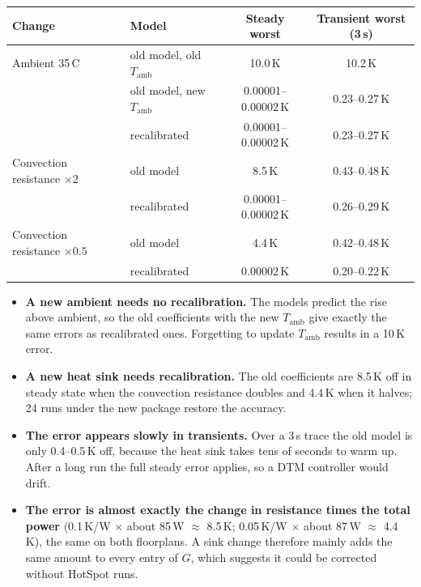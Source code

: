 \documentclass[11pt,a4paper]{article}
\newcommand{\degC}{\,\textdegree C}
\begin{document}
\begin{center}
\small
\begin{tabular}{@{}l l c c@{}}
\toprule
Change & Model & Steady worst & Transient worst (3\,s) \\
\midrule
Ambient 35\degC & old model, old $T_\text{amb}$ & 10.0\,K & 10.2\,K \\
 & old model, new $T_\text{amb}$ & 0.00001--0.00002\,K & 0.23--0.27\,K \\
 & recalibrated & 0.00001--0.00002\,K & 0.23--0.27\,K \\
\midrule
Convection resistance $\times 2$ & old model & 8.5\,K & 0.43--0.48\,K \\
 & recalibrated & 0.00001--0.00002\,K & 0.26--0.29\,K \\
\midrule
Convection resistance $\times 0.5$ & old model & 4.4\,K & 0.42--0.48\,K \\
 & recalibrated & 0.00002\,K & 0.20--0.22\,K \\
\bottomrule
\end{tabular}
\end{center}
\begin{itemize}
  \item \textbf{A new ambient needs no recalibration.} The models predict the rise above ambient,
        so the old coefficients with the new $T_\text{amb}$ give exactly the same errors as
        recalibrated ones. Forgetting to update $T_\text{amb}$ results in a 10\,K error.
  \item \textbf{A new heat sink needs recalibration.} The old coefficients are 8.5\,K off in steady
        state when the convection resistance doubles and 4.4\,K when it halves; 24 runs under the
        new package restore the accuracy.
  \item \textbf{The error appears slowly in transients.} Over a 3\,s trace the old model is only
        0.4--0.5\,K off, because the heat sink takes tens of seconds to warm up. After a long run
        the full steady error applies, so a DTM controller would drift.
  \item \textbf{The error is almost exactly the change in resistance times the total power}
        (0.1\,K/W $\times$ about 85\,W $\approx$ 8.5\,K; 0.05\,K/W $\times$ about 87\,W
        $\approx$ 4.4\,K), the same on both floorplans. A sink change therefore mainly adds the same
        amount to every entry of $G$, which suggests it could be corrected without HotSpot runs.
\end{itemize}
\end{document}
